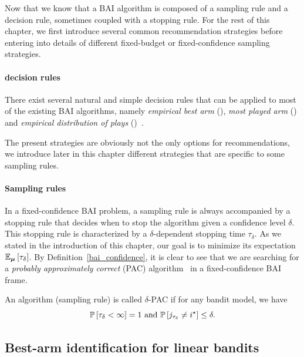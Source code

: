 Now that we know that a BAI algorithm is composed of a sampling rule and a decision rule, sometimes coupled with a stopping rule. For the rest of this chapter, we first introduce several common recommendation strategies before entering into details of different fixed-budget or fixed-confidence sampling strategies. 

\paragraph{decision rules}

There exist several natural and simple decision rules that can be applied to most of the existing BAI algorithms, namely \emph{empirical best arm} (\EBA), \emph{most played arm} (\MPA) and \emph{empirical distribution of plays} (\EDP)~\citep{bubeck2009pure}.

\begin{remark}
The present strategies are obviously not the only options for recommendations, we introduce later in this chapter different strategies that are specific to some sampling rules.
\end{remark}

\paragraph{Sampling rules}

In a fixed-confidence BAI problem, a sampling rule is always accompanied by a stopping rule that decides when to stop the algorithm given a confidence level $\delta$. This stopping rule is characterized by a $\delta$-dependent stopping time $\tau_{\delta}$. As we stated in the introduction of this chapter, our goal is to minimize its expectation $\mathbb{E}_{{\boldsymbol \mu}}\left[\tau_{\delta}\right]$. By Definition~\ref{bai_confidence}, it is clear to see that we are searching for a \emph{probably approximately correct} (PAC) algorithm~\citep{valiant1984pac} in a fixed-confidence BAI frame.

\begin{definition}
An algorithm (sampling rule) is called $\delta$-PAC if for any bandit model, we have
\[
	\mathbb{P}\left[\tau_\delta < \infty\right] = 1 \text{ and } \mathbb{P}\left[j_{\tau_\delta}\neq i^{\star}\right] \leq \delta.
\]
\end{definition}

\subsection{Best-arm identification for linear bandits}

